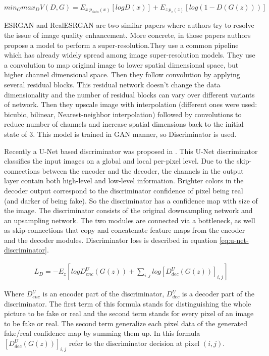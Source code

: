 \begin{equation}
    \label{eq:gan}
    min_G max_D V(D, G) = E_{x~p_{data}(x)} [log D(x)] + E_{z~p_z(z)} [log(1 - D(G(z)))]
\end{equation}

ESRGAN \cite{Wang_Yu_Wu_Gu_Liu_Dong_Qiao_Loy_2019} and RealESRGAN \cite{Wang_Xie_Dong_Shan_2021} are two similar papers where authors try to resolve the issue of image quality enhancement. More concrete, in those papers authors propose a model to perform a super-resolution.They use a common pipeline which has already widely spread among image super-resolution models. They use a convolution to map original image to lower spatial dimensional space, but higher channel dimensional space. Then they follow convolution by applying several residual blocks. This residual network doesn't change the data dimensionality and the number of residual blocks can vary over different variants of network. Then they upscale image with interpolation (different ones were used: bicubic, bilinear, Nearest-neighbor interpolation) followed by convolutions to reduce number of channels and increase spatial dimensions back to the initial state of 3. This model is trained in GAN manner, so Discriminator is used.

Recently a U-Net based discriminator was proposed in \cite{schonfeld_u-net_2021}. This U-Net discriminator classifies the input images on a global and local per-pixel level. Due to the skip-connections between the encoder and the decoder, the channels in the output layer contain both high-level and low-level information. Brighter colors in the decoder output correspond to the discriminator confidence of pixel being real (and darker of being fake). So the discriminator has a confidence map with size of the image. The discriminator consists of the original downsampling network and an upsampling network. The two modules are connected via a bottleneck, as well as skip-connections that copy and concatenate feature maps from the encoder and the decoder modules. Discriminator loss is described in equation \ref{eq:u-net-discriminator}.

\begin{equation}
    \label{eq:u-net-discriminator}
    \begin{split}
        L_D = -E_z[log D_{enc}^U(G(z)) + \sum_{i,j}{log [D_{dec}^U(G(z))]_{i,j}}]
    \end{split}
\end{equation}

Where $D_{enc}^U$ is an encoder part of the discriminator, $D_{dec}^U$ is a decoder part of the discriminator. The first term of this formula stands for distinguishing the whole picture to be fake or real and the second term stands for every pixel of an image to be fake or real. The second term generalize each pixel data of the generated fake/real confidence map by summing them up. In this formula $[D_{dec}^U(G(z))]_{i,j}$ refer to the discriminator decision at pixel $(i,j)$.

